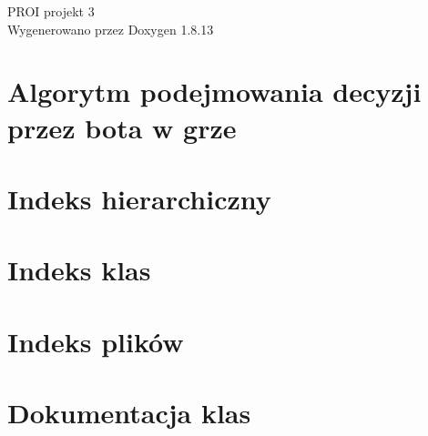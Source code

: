 \documentclass[twoside]{book}
\newcommand{\+}{\discretionary{\mbox{\scriptsize$\hookleftarrow$}}{}{}}
\newcommand{\clearemptydoublepage}{%
  \newpage{\pagestyle{empty}\cleardoublepage}%
}
\begin{document}
\hypersetup{pageanchor=false,
             bookmarksnumbered=true,
             pdfencoding=unicode
            }
\begin{titlepage}
\vspace*{7cm}
\begin{center}%
{\Large P\+R\+OI projekt 3 }\\
\vspace*{1cm}
{\large Wygenerowano przez Doxygen 1.8.13}\\
\end{center}
\end{titlepage}
\clearemptydoublepage
{}
\tableofcontents
\clearemptydoublepage
{}
\hypersetup{pageanchor=true}

\chapter{Algorytm podejmowania decyzji przez bota w grze}
\label{index}\hypertarget{index}{}
\chapter{Indeks hierarchiczny}

\chapter{Indeks klas}

\chapter{Indeks plików}

\chapter{Dokumentacja klas}



























\end{document}
